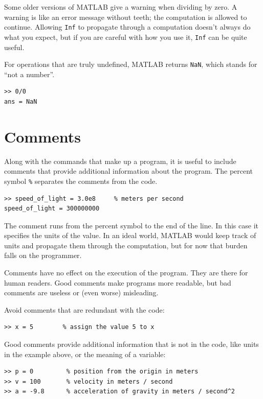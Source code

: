 \documentclass[
]{book}
\begin{document}
Some older versions of MATLAB give a warning when dividing by zero.
A warning is like an error message without teeth; the computation
is allowed to continue.  Allowing {\tt Inf} to propagate
through a computation doesn't always do what you expect, but if you
are careful with how you use it, {\tt Inf} can be quite useful.

For operations that are truly undefined, MATLAB returns {\tt NaN},
which stands for ``not a number''.

\begin{verbatim}
>> 0/0
ans = NaN
\end{verbatim}



\section{Comments}

Along with the commands that make up a program, it is useful
to include comments that provide additional information about the
program.  The percent symbol {\tt \%} separates
the comments from the code.

\begin{verbatim}
>> speed_of_light = 3.0e8     % meters per second
speed_of_light = 300000000
\end{verbatim}

The comment runs from the percent symbol to the end of the line.
In this case it specifies the units of the value.  In an ideal world,
MATLAB would keep track of units and propagate them through the
computation, but for now that burden falls on the programmer.

Comments have no effect on the execution of the program.  They
are there for human readers.  Good comments make programs more
readable, but bad comments are useless or (even worse) misleading.

Avoid comments that are redundant with the code:

\begin{verbatim}
>> x = 5        % assign the value 5 to x
\end{verbatim}

Good comments provide additional information that is not in the
code, like units in the example above, or the meaning of a variable:

\begin{verbatim}
>> p = 0         % position from the origin in meters
>> v = 100       % velocity in meters / second
>> a = -9.8      % acceleration of gravity in meters / second^2
\end{verbatim}
\end{document}
